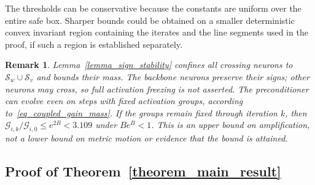 \documentclass[letterpaper, 10 pt, conference]{ieeeconf}
\newcommand{\cG}{\mathcal{G}}
\newcommand{\cS}{\mathcal{S}}
\newtheorem{remark}{Remark}
\newcommand{\Lemm}{Lemma}
\newcommand{\Thm}{Theorem}
\begin{document}
The thresholds can be conservative because the constants
are uniform over the entire safe box. Sharper bounds could be obtained
on a smaller deterministic convex invariant region containing the
iterates and the line segments used in the proof, if such a region is
established separately.

\begin{remark} \label{remark_activation_freeze}
\Lemm~\ref{lemma_sign_stability} confines all crossing neurons to
$\cS_w\cup\cS_v$ and bounds their mass. The backbone neurons preserve
their signs; other neurons may cross, so full activation freezing is
not asserted. The preconditioner can evolve even on steps with fixed
activation groups, according to~\eqref{eq_coupled_gain_mass}.
If the groups remain fixed through iteration $k$, then
$\cG_{i,k}/\cG_{i,0}\le e^{2B}<3.109$ under $Be^B<1$.
This is an upper bound on amplification, not a lower bound on metric motion or evidence that the bound is attained.
\end{remark}

\subsection{Proof of \Thm~\ref{theorem_main_result}}
 
\end{document}
